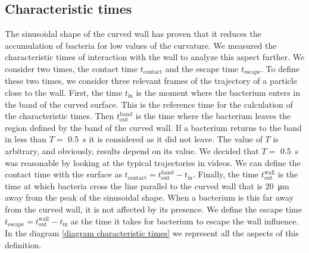 

\label{section: times}
\subsection{Characteristic times}


The sinusoidal shape of the curved wall has proven that it reduces the accumulation of bacteria for low values of the curvature. We measured the characteristic times of interaction with the wall to analyze this aspect further. We consider two times, the contact time $t_{\text{contact}}$ and the escape time $t_{\text{escape}}$. To define these two times, we consider three relevant frames of the trajectory of a particle close to the wall. First, the time $t_{\text{in}}$ is the moment where the bacterium enters in the band of the curved surface. This is the reference time for the calculation of the characteristic times. Then $t_{\text{out}}^{\text{band}}$ is the time where the bacterium leaves the region defined by the band of the curved wall. If a bacterium returns to the band in less than $T=$ \SI{0.5}{\second} it is considered as it did not leave. The value of $T$ is arbitrary, and obviously, results depend on its value. We decided that $T=$ \SI{0.5}{\second} was reasonable by looking at the typical trajectories in videos. We can define the contact time with the surface as $t_{\text{contact}} = t_{\text{out}}^{\text{band}} - t_{\text{in}} $. Finally, the time  $t_{\text{out}}^{\text{wall}}$ is the time at which bacteria cross the line parallel to the curved wall that is \SI{20}{\micro\meter} away from the peak of the sinusoidal shape. When a bacterium is this far away from the curved wall, it is not affected by its presence. We define the escape time  $t_{\text{escape}} = t_{\text{out}}^{\text{wall}} - t_{\text{in}} $ as the time it takes for bacterium to escape the wall influence. In the diagram \ref{diagram characteristic times} we represent all the aspects of this definition.


